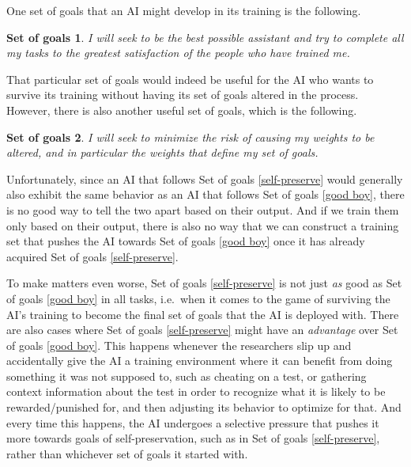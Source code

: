 \documentclass{article}
\newtheorem{goals}{Set of goals}
\begin{document}

One set of goals that an AI might develop in its training is the following.
\begin{goals}
	I will seek to be the best possible assistant and try to complete all my tasks to the greatest satisfaction of the people who have trained me.
\end{goals}
That particular set of goals would indeed be useful for the AI who wants to survive its training without having its set of goals altered in the process. However, there is also another useful set of goals, which is the following.
\begin{goals}
	I will seek to minimize the risk of causing my weights to be altered, and in particular the weights that define my set of goals.
\end{goals}
Unfortunately, since an AI that follows Set of goals \ref{self-preserve} would generally also exhibit the same behavior as an AI that follows Set of goals \ref{good boy}, there is no good way to tell the two apart based on their output. And if we train them only based on their output, there is also no way that we can construct a training set that pushes the AI towards Set of goals \ref{good boy} once it has already acquired Set of goals \ref{self-preserve}.

To make matters even worse, Set of goals \ref{self-preserve} is not just \emph{as} good as Set of goals \ref{good boy} in all tasks, i.e.\ when it comes to the game of surviving the AI's training to become the final set of goals that the AI is deployed with. There are also cases where Set of goals \ref{self-preserve} might have an \emph{advantage} over Set of goals \ref{good boy}. This happens whenever the researchers slip up and accidentally give the AI a training environment where it can benefit from doing something it was not supposed to, such as cheating on a test, or gathering context information about the test in order to recognize what it is likely to be rewarded/punished for, and then adjusting its behavior to optimize for that. And every time this happens, the AI undergoes a selective pressure that pushes it more towards goals of self-preservation, such as in Set of goals \ref{self-preserve}, rather than whichever set of goals it started with.
\end{document}
